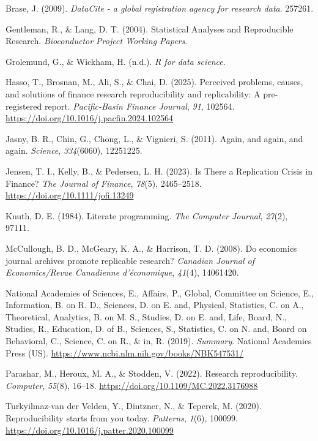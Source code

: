 \documentclass[
  a4paper,
]{article}
\newlength{\cslhangindent}
\newenvironment{CSLReferences}[2] %
 {\begin{list}{}{%
  \setlength{\itemindent}{0pt}
  \setlength{\leftmargin}{0pt}
  \setlength{\parsep}{0pt}
  \ifodd #1
   \setlength{\leftmargin}{\cslhangindent}
   \setlength{\itemindent}{-1\cslhangindent}
  \fi
  \setlength{\itemsep}{#2\baselineskip}}}
 {\end{list}}
\begin{document}
\label{refs}
\begin{CSLReferences}{1}{0}
Brase, J. (2009). \emph{DataCite - a global registration agency for
research data}. 257261.

Gentleman, R., \& Lang, D. T. (2004). Statistical {Analyses} and
{Reproducible Research}. \emph{Bioconductor Project Working Papers}.

Grolemund, G., \& Wickham, H. (n.d.). \emph{R for data science}.

Hasso, T., Brosnan, M., Ali, S., \& Chai, D. (2025). Perceived problems,
causes, and solutions of finance research reproducibility and
replicability: A pre-registered report. \emph{Pacific-Basin Finance
Journal}, \emph{91}, 102564.
\url{https://doi.org/10.1016/j.pacfin.2024.102564}

Jasny, B. R., Chin, G., Chong, L., \& Vignieri, S. (2011). Again, and
again, and again. \emph{Science}, \emph{334}(6060), 12251225.

Jensen, T. I., Kelly, B., \& Pedersen, L. H. (2023). Is There a
Replication Crisis in Finance? \emph{The Journal of Finance},
\emph{78}(5), 2465--2518. \url{https://doi.org/10.1111/jofi.13249}

Knuth, D. E. (1984). Literate programming. \emph{The Computer Journal},
\emph{27}(2), 97111.

McCullough, B. D., McGeary, K. A., \& Harrison, T. D. (2008). Do
economics journal archives promote replicable research? \emph{Canadian
Journal of Economics/Revue Canadienne d'économique}, \emph{41}(4),
14061420.

National Academies of Sciences, E., Affairs, P., Global, Committee on
Science, E., Information, B. on R. D., Sciences, D. on E. and, Physical,
Statistics, C. on A., Theoretical, Analytics, B. on M. S., Studies, D.
on E. and, Life, Board, N., Studies, R., Education, D. of B., Sciences,
S., Statistics, C. on N. and, Board on Behavioral, C., Science, C. on
R., \& in, R. (2019). \emph{Summary}. National Academies Press (US).
\url{https://www.ncbi.nlm.nih.gov/books/NBK547531/}

Parashar, M., Heroux, M. A., \& Stodden, V. (2022). Research
reproducibility. \emph{Computer}, \emph{55}(8), 16--18.
\url{https://doi.org/10.1109/MC.2022.3176988}

Turkyilmaz-van der Velden, Y., Dintzner, N., \& Teperek, M. (2020).
Reproducibility starts from you today. \emph{Patterns}, \emph{1}(6),
100099. \url{https://doi.org/10.1016/j.patter.2020.100099}

\end{CSLReferences}
\end{document}

